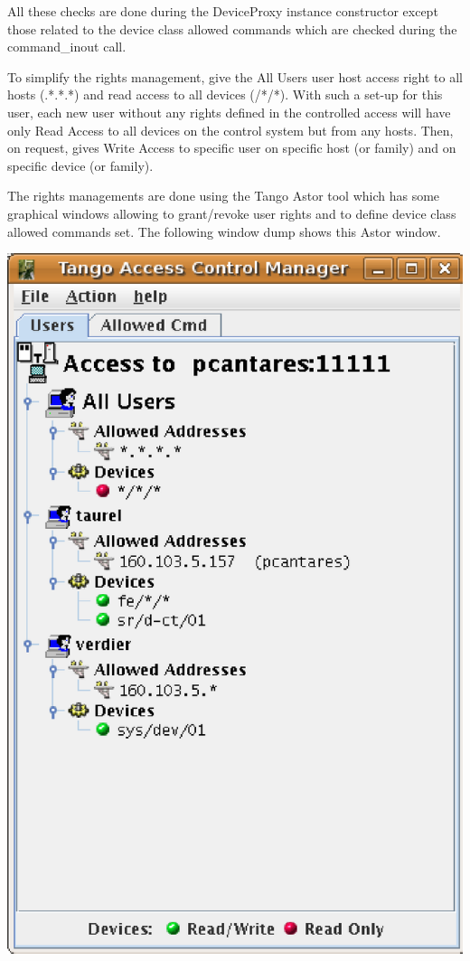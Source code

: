 All these checks are done during the DeviceProxy instance constructor
except those related to the device class allowed commands which are
checked during the command\_inout call.

To simplify the rights management, give the \textquotedbl{}All Users\textquotedbl{}
user host access right to all hosts (\textquotedbl{}{*}.{*}.{*}.{*}\textquotedbl{})
and read access to all devices (\textquotedbl{}{*}/{*}/{*}\textquotedbl{}).
With such a set-up for this user, each new user without any rights
defined in the controlled access will have only Read Access to all
devices on the control system but from any hosts. Then, on request,
gives Write Access to specific user on specific host (or family) and
on specific device (or family). 

The rights managements are done using the Tango Astor\cite{Astor_doc}
tool which has some graphical windows allowing to grant/revoke user
rights and to define device class allowed commands set. The following
window dump shows this Astor window.\begin{center}\includegraphics{advanced/control}\end{center}


